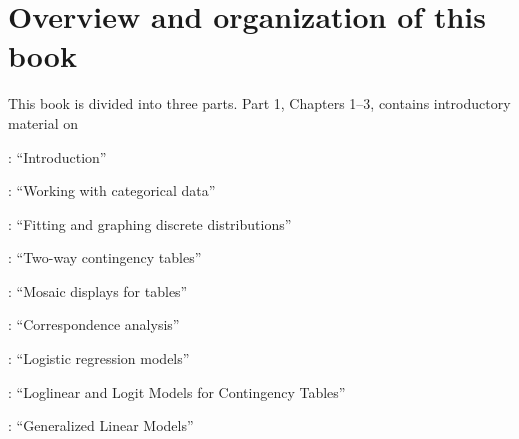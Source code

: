 \section*{Overview and organization of this book}

This book is divided into three parts. Part 1, Chapters 1--3, contains 
introductory material on 

: ``Introduction'' 

: ``Working with categorical data''

: ``Fitting and graphing discrete distributions''

: ``Two-way contingency tables''

: ``Mosaic displays for \nway tables''

: ``Correspondence analysis''

: ``Logistic regression models''

: ``Loglinear and Logit Models for Contingency Tables''

: ``Generalized Linear Models''







